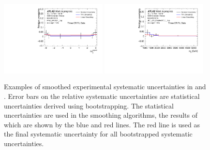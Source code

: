 \begin{figure}[t]
  \includegraphics[width=0.48\textwidth]{plots/diffx/expsysts/indiv/sys_errors_jj_dphi_QCD_Sh2211_Signal_Sh2211_BSEXPSYSTS_PRW_DATASF__1up_3cr.pdf}
  \includegraphics[width=0.48\textwidth]{plots/diffx/expsysts/indiv/sys_errors_mjj_QCD_Sh2211_Signal_Sh2211_BSEXPSYSTS_JET_JER_EffectiveNP_7__1up_3cr.pdf}
  \caption{Examples of smoothed experimental systematic uncertainties in \dphisigned and \mjj. Error bars on the relative systematic uncertainties are statistical uncertainties derived using bootstrapping. The statistical uncertainties are used in the smoothing algorithms, the results of which are shown by the blue and red lines. The red line is used as the final systematic uncertainty for all bootstrapped systematic uncertainties.}
  \label{fig:expuncexamples}
\end{figure}

